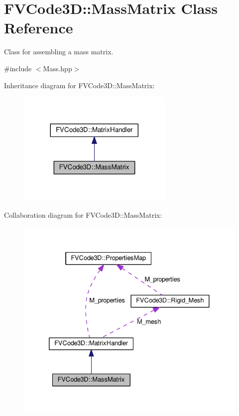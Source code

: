 \hypertarget{classFVCode3D_1_1MassMatrix}{}\section{F\+V\+Code3D\+:\+:Mass\+Matrix Class Reference}
\label{classFVCode3D_1_1MassMatrix}


Class for assembling a mass matrix.  




{\ttfamily \#include $<$Mass.\+hpp$>$}



Inheritance diagram for F\+V\+Code3D\+:\+:Mass\+Matrix\+:
\nopagebreak
\begin{figure}[H]
\begin{center}
\leavevmode
\includegraphics[width=212pt]{classFVCode3D_1_1MassMatrix__inherit__graph}
\end{center}
\end{figure}


Collaboration diagram for F\+V\+Code3D\+:\+:Mass\+Matrix\+:
\nopagebreak
\begin{figure}[H]
\begin{center}
\leavevmode
\includegraphics[width=332pt]{classFVCode3D_1_1MassMatrix__coll__graph}
\end{center}
\end{figure}
